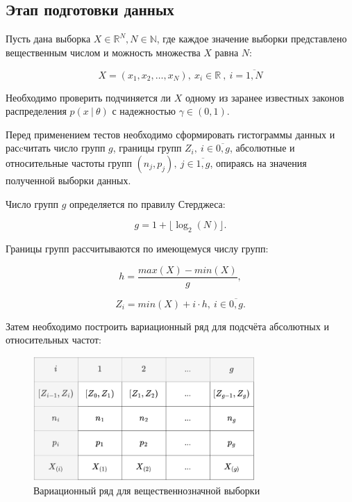 \documentclass[
  14,
]{article}
\begin{document}
\hypertarget{ux44dux442ux430ux43f-ux43fux43eux434ux433ux43eux442ux43eux432ux43aux438-ux434ux430ux43dux43dux44bux445}{%
\subsection{\texorpdfstring{\textbf{Этап подготовки
данных}}{Этап подготовки данных}}\label{ux44dux442ux430ux43f-ux43fux43eux434ux433ux43eux442ux43eux432ux43aux438-ux434ux430ux43dux43dux44bux445}}

Пусть дана выборка \(X \in \mathbb{R}^N, N\in \mathbb{N}\), где каждое
значение выборки представлено вещественным числом и можность множества
\(X\) равна \(N\):

\[
X = (x_1, x_2, \dots, x_N), \ x_i \in \mathbb{R}\ , \ i=\overline{1,N}
\]

Необходимо проверить подчиняется ли \(X\) одному из заранее известных
законов распределения \(p(x\ |\ \theta)\) с надежностью
\(\gamma \in (0, 1)\).

Перед применением тестов необходимо сформировать гистограммы данных и
расcчитать число групп \(g\), границы групп
\(Z_i,\ i\in \overline{0,g}\), абсолютные и относительные частоты групп
\((n_j, p_j),\ j \in \overline{1,g}\), опираясь на значения полученной
выборки данных.

Число групп \(g\) определяется по правилу Стерджеса:

\[
g = 1 + \lfloor \log_2(N) \rfloor.
\]

Границы групп рассчитываются по имеющемуся числу групп:

\[
h = \frac{max(X) - min(X)}{g},
\]

\[
Z_i = min(X) + i \cdot h, \ i \in \overline{0, g}.
\]

Затем необходимо построить вариационный ряд для подсчёта абсолютных и
относительных частот:

\begin{figure}
\centering
\includegraphics[width=0.75\textwidth,height=\textheight]{hist_table.png}
\caption{Вариационный ряд для вещественнозначной выборки}
\end{figure}
\end{document}
